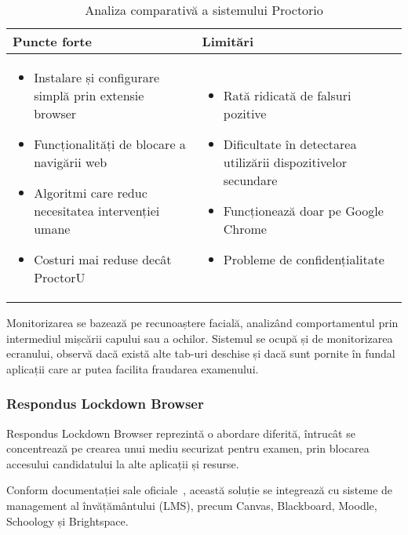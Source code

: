 \documentclass[12pt,a4paper]{article}
\begin{document}
\begin{table}[h]
\centering
\begin{tabular}{|p{8.5cm}|p{8.5cm}|}
\hline
\textbf{Puncte forte} & \textbf{Limitări} \\
\hline
\begin{itemize}
    \item Instalare și configurare simplă prin extensie browser
    \item Funcționalități de blocare a navigării web
    \item Algoritmi care reduc necesitatea intervenției umane
    \item Costuri mai reduse decât ProctorU
\end{itemize} & 
\begin{itemize}
    \item Rată ridicată de falsuri pozitive
    \item Dificultate în detectarea utilizării dispozitivelor secundare
    \item Funcționează doar pe Google Chrome
    \item Probleme de confidențialitate
\end{itemize} \\
\hline
\end{tabular}
\caption{Analiza comparativă a sistemului Proctorio}
\end{table}

Monitorizarea se bazează pe recunoaștere facială, analizând comportamentul prin 
intermediul mișcării capului sau a ochilor. Sistemul se ocupă și de monitorizarea 
ecranului, observă dacă există alte tab-uri deschise și dacă sunt pornite în fundal 
aplicații care ar putea facilita fraudarea examenului.

\subsubsection{Respondus Lockdown Browser}
Respondus Lockdown Browser reprezintă o abordare diferită, 
întrucât se concentrează pe crearea unui mediu securizat pentru examen,
prin blocarea accesului candidatului la alte aplicații și resurse.

Conform documentației sale oficiale~\cite{respondus}, această soluție se
integrează cu sisteme de management al învățământului (LMS), precum Canvas,
Blackboard, Moodle, Schoology și Brightspace.
\end{document}
